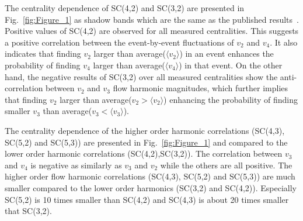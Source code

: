 \documentclass[ALICE,manyauthors]{cernphprep}
\begin{document}
The centrality dependence of SC(4,2) and SC(3,2) are presented in Fig.~\ref{fig:Figure_1} as shadow bands which are the same as the published results~\cite{ALICE:2016kpq}. Positive values of SC(4,2) are observed for all measured centralities. This suggests a positive correlation between the event-by-event fluctuations of $v_2$ and $v_4$. It also indicates that finding $v_2$ larger than average($\langle v_2 \rangle$) in an event enhances the probability of finding $v_4$ larger than average($\langle v_4 \rangle$) in that event. On the other hand, the negative results of SC(3,2) over all measured centralities show the anti-correlation between $v_2$ and $v_3$ flow harmonic magnitudes, which further implies that finding $v_2$ larger than average($v_2 > \langle v_2 \rangle$) enhancing the probability of finding smaller $v_3$ than average($v_3 < \langle v_3 \rangle$).

 

The centrality dependence of the higher order harmonic correlations (SC(4,3), SC(5,2) and SC(5,3)) are presented in Fig.~\ref{fig:Figure_1} and compared to the lower order harmonic correlations (SC(4,2),SC(3,2)). The correlation between $v_3$ and $v_4$ is negative as similarly as $v_3$ and $v_2$ while the others are all positive. 
The higher order flow harmonic correlations (SC(4,3), SC(5,2) and SC(5,3)) are much smaller compared to the lower order harmonics (SC(3,2) and SC(4,2)). Especially SC(5,2) is 10 times smaller than SC(4,2) and SC(4,3) is about 20 times smaller that SC(3,2).
\end{document}
